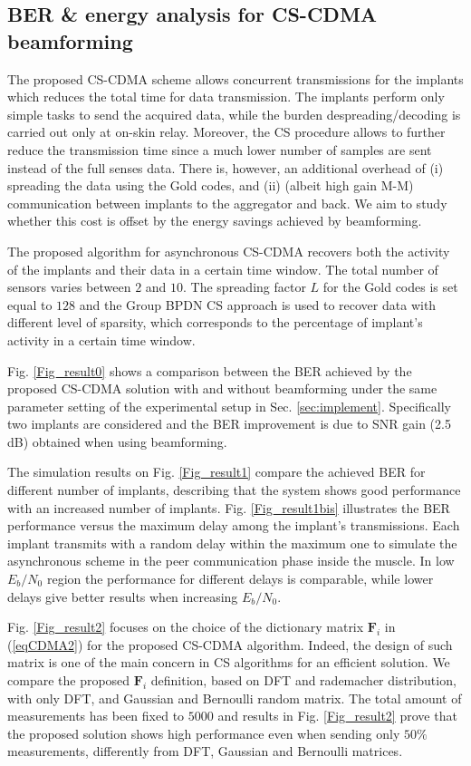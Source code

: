 \subsection{BER \& energy analysis for CS-CDMA beamforming}

The proposed CS-CDMA scheme allows concurrent transmissions for the implants which reduces the total time for data transmission. The implants perform only simple tasks to send the acquired data, while the burden despreading/decoding is carried out only at on-skin relay. Moreover, the CS procedure allows to further reduce the transmission time since a much lower number of samples are sent instead of the full senses data. There is, however, an additional overhead of (i) spreading the data using the Gold codes, and (ii) (albeit high gain M-M) communication between implants to the aggregator and back. We aim to study whether this cost is offset by the energy savings achieved by beamforming.

The proposed algorithm for asynchronous CS-CDMA recovers both the activity of the implants and their data in a certain time window.
The total number of sensors varies between $2$ and $10$. The spreading factor $L$ for the Gold codes is set equal to $128$ and the Group BPDN CS approach is used to recover data with different level of sparsity, which corresponds to the percentage of implant's activity in a certain time window.

Fig. \ref{Fig_result0} shows a comparison between the BER achieved by the proposed CS-CDMA solution with and without beamforming under the same parameter setting of the experimental setup in Sec. \ref{sec:implement}. Specifically two implants are considered and the BER improvement is due to SNR gain (2.5 dB) obtained when using beamforming.

The simulation results on Fig. \ref{Fig_result1} compare the achieved BER for different number of implants, describing that the system shows good performance with an increased number of implants. Fig. \ref{Fig_result1bis} illustrates the BER performance versus the maximum delay among the implant's transmissions. Each implant transmits with a random delay within the maximum one to simulate the asynchronous scheme in the peer communication phase inside the muscle. In low $E_b/N_0$ region the performance for different delays is comparable, while lower delays give better results when increasing $E_b/N_0$.

Fig. \ref{Fig_result2} focuses on the choice of the dictionary matrix $\mathbf{F}_i$ in (\ref{eqCDMA2}) for the proposed CS-CDMA algorithm. Indeed, the design of such matrix is one of the main concern in CS algorithms for an efficient solution. We compare the proposed $\mathbf{F}_i$ definition, based on DFT and rademacher distribution, with only DFT, and Gaussian and Bernoulli random matrix. The total amount of measurements has been fixed to $5000$ and results in Fig. \ref{Fig_result2} prove that the proposed solution shows high performance even when sending only $50 \%$ measurements, differently from DFT, Gaussian and Bernoulli matrices.

